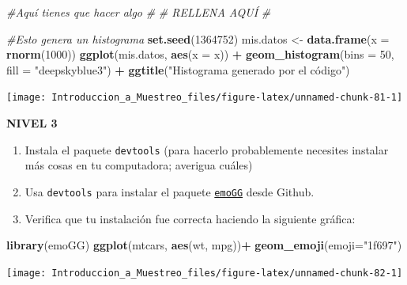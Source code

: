 \documentclass[
]{book}
\newenvironment{Shaded}{\begin{snugshade}}{\end{snugshade}}
\newcommand{\CommentTok}[1]{\textcolor[rgb]{0.56,0.35,0.01}{\textit{#1}}}
\newcommand{\DataTypeTok}[1]{\textcolor[rgb]{0.13,0.29,0.53}{#1}}
\newcommand{\DecValTok}[1]{\textcolor[rgb]{0.00,0.00,0.81}{#1}}
\newcommand{\KeywordTok}[1]{\textcolor[rgb]{0.13,0.29,0.53}{\textbf{#1}}}
\newcommand{\NormalTok}[1]{#1}
\newcommand{\OperatorTok}[1]{\textcolor[rgb]{0.81,0.36,0.00}{\textbf{#1}}}
\newcommand{\StringTok}[1]{\textcolor[rgb]{0.31,0.60,0.02}{#1}}
\providecommand{\tightlist}{%
  \setlength{\itemsep}{0pt}\setlength{\parskip}{0pt}}
\begin{document}
\begin{Shaded}
\begin{Highlighting}[]
\CommentTok{#Aquí tienes que hacer algo}
\CommentTok{#}
\CommentTok{# RELLENA AQUÍ}
\CommentTok{#}

\CommentTok{#Esto genera un histograma}
\KeywordTok{set.seed}\NormalTok{(}\DecValTok{1364752}\NormalTok{)}
\NormalTok{mis.datos <-}\StringTok{ }\KeywordTok{data.frame}\NormalTok{(}\DataTypeTok{x =} \KeywordTok{rnorm}\NormalTok{(}\DecValTok{1000}\NormalTok{))}
\KeywordTok{ggplot}\NormalTok{(mis.datos, }\KeywordTok{aes}\NormalTok{(}\DataTypeTok{x =}\NormalTok{ x)) }\OperatorTok{+}\StringTok{ }
\StringTok{  }\KeywordTok{geom_histogram}\NormalTok{(}\DataTypeTok{bins =} \DecValTok{50}\NormalTok{, }\DataTypeTok{fill =} \StringTok{"deepskyblue3"}\NormalTok{) }\OperatorTok{+}
\StringTok{  }\KeywordTok{ggtitle}\NormalTok{(}\StringTok{"Histograma generado por el código")}
\end{Highlighting}
\end{Shaded}

\begin{center}\texttt{[image: Introduccion\_a\_Muestreo\_files/figure-latex/unnamed-chunk-81-1]} \end{center}

\textbf{NIVEL 3}

\begin{enumerate}
\def\labelenumi{\arabic{enumi}.}
\tightlist
\item
  Instala el paquete \texttt{devtools} (para hacerlo probablemente necesites instalar más cosas en tu computadora; averigua cuáles)
\item
  Usa \texttt{devtools} para instalar el paquete \href{https://github.com/dill/emoGG}{\texttt{emoGG}} desde Github.
\item
  Verifica que tu instalación fue correcta haciendo la siguiente gráfica:
\end{enumerate}

\begin{Shaded}
\begin{Highlighting}[]
\KeywordTok{library}\NormalTok{(emoGG)}
\KeywordTok{ggplot}\NormalTok{(mtcars, }\KeywordTok{aes}\NormalTok{(wt, mpg))}\OperatorTok{+}\StringTok{ }\KeywordTok{geom_emoji}\NormalTok{(}\DataTypeTok{emoji=}\StringTok{"1f697"}\NormalTok{)}
\end{Highlighting}
\end{Shaded}

\begin{center}\texttt{[image: Introduccion\_a\_Muestreo\_files/figure-latex/unnamed-chunk-82-1]} \end{center}
\end{document}
